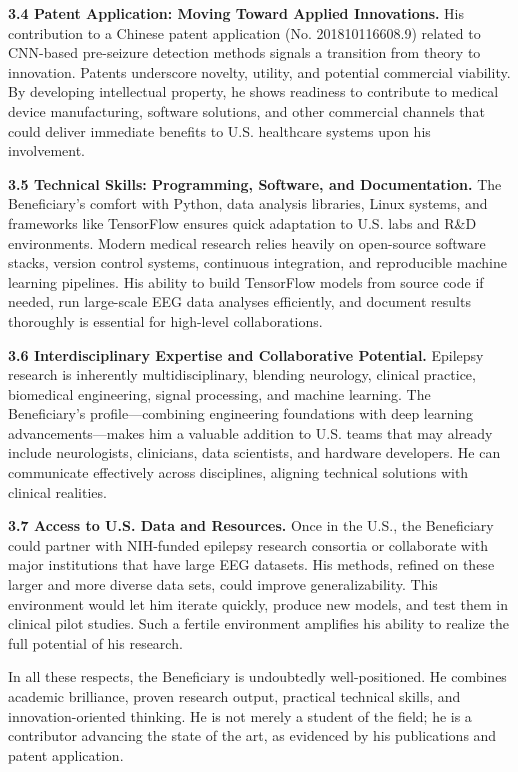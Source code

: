 \documentclass{article}
\begin{document}
{\bf 3.4 Patent Application: Moving Toward Applied Innovations.}
His contribution to a Chinese patent application (No. 201810116608.9) related to CNN-based pre-seizure detection methods signals a transition from theory to innovation. Patents underscore novelty, utility, and potential commercial viability. By developing intellectual property, he shows readiness to contribute to medical device manufacturing, software solutions, and other commercial channels that could deliver immediate benefits to U.S. healthcare systems upon his involvement.


{\bf 3.5 Technical Skills: Programming, Software, and Documentation.}
The Beneficiary’s comfort with Python, data analysis libraries, Linux systems, and frameworks like TensorFlow ensures quick adaptation to U.S. labs and R\&D environments. Modern medical research relies heavily on open-source software stacks, version control systems, continuous integration, and reproducible machine learning pipelines. His ability to build TensorFlow models from source code if needed, run large-scale EEG data analyses efficiently, and document results thoroughly is essential for high-level collaborations.


{\bf 3.6 Interdisciplinary Expertise and Collaborative Potential.}
Epilepsy research is inherently multidisciplinary, blending neurology, clinical practice, biomedical engineering, signal processing, and machine learning. The Beneficiary’s profile—combining engineering foundations with deep learning advancements—makes him a valuable addition to U.S. teams that may already include neurologists, clinicians, data scientists, and hardware developers. He can communicate effectively across disciplines, aligning technical solutions with clinical realities.

{\bf 3.7 Access to U.S. Data and Resources.}
Once in the U.S., the Beneficiary could partner with NIH-funded epilepsy research consortia or collaborate with major institutions that have large EEG datasets. His methods, refined on these larger and more diverse data sets, could improve generalizability. This environment would let him iterate quickly, produce new models, and test them in clinical pilot studies. Such a fertile environment amplifies his ability to realize the full potential of his research.

In all these respects, the Beneficiary is undoubtedly well-positioned. He combines academic brilliance, proven research output, practical technical skills, and innovation-oriented thinking. He is not merely a student of the field; he is a contributor advancing the state of the art, as evidenced by his publications and patent application.
\end{document}
